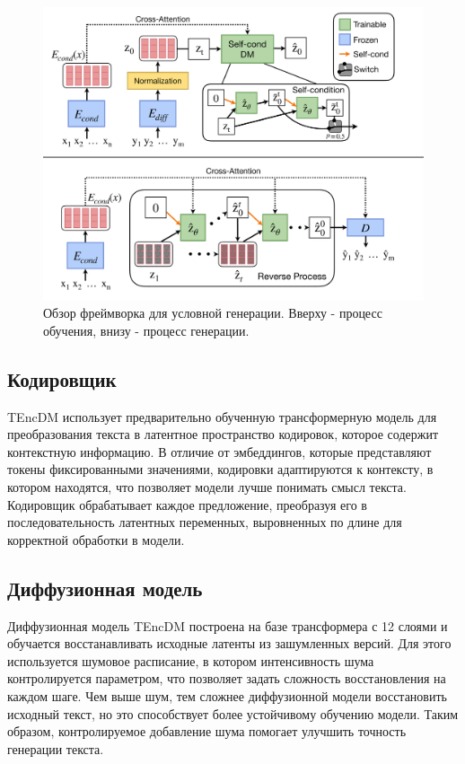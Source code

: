 \documentclass[a4paper, 12pt]{article}
\begin{document}
\begin{figure}[t]
\begin{center}
\centerline{\includegraphics[width=\columnwidth]{images/framework.pdf}}
\caption{Обзор фреймворка для условной генерации. Вверху - процесс обучения, внизу - процесс генерации.}
\label{fig::model_pipeline}
\end{center}
\end{figure}

\subsection{Кодировщик}
TEncDM использует предварительно обученную трансформерную модель для преобразования текста в латентное пространство кодировок, которое содержит контекстную информацию. В отличие от эмбеддингов, которые представляют токены фиксированными значениями, кодировки адаптируются к контексту, в котором находятся, что позволяет модели лучше понимать смысл текста. Кодировщик обрабатывает каждое предложение, преобразуя его в последовательность латентных переменных, выровненных по длине для корректной обработки в модели.

\subsection{Диффузионная модель}
Диффузионная модель TEncDM построена на базе трансформера с 12 слоями и обучается восстанавливать исходные латенты из зашумленных версий. Для этого используется шумовое расписание, в котором интенсивность шума контролируется параметром, что позволяет задать сложность восстановления на каждом шаге. Чем выше шум, тем сложнее диффузионной модели восстановить исходный текст, но это способствует более устойчивому обучению модели. Таким образом, контролируемое добавление шума помогает улучшить точность генерации текста.
\end{document}
